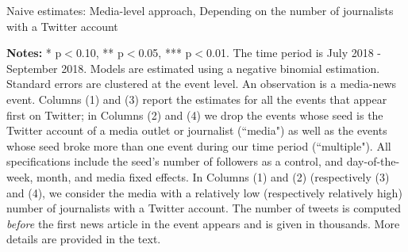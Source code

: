 \clearpage
\pagebreak
\begin{table}
\caption{Naive estimates: Media-level approach, Depending on the number of journalists with a Twitter account}
\begin{center}
	
\end{center}
\begin{spacing}{0.5}
	{\fns \textbf{Notes:} * p$<$0.10, ** p$<$0.05, *** p$<$0.01. The time period is July 2018 - September 2018. Models are estimated using a negative binomial estimation. Standard errors are clustered at the event level. An observation is a media-news event.  Columns (1) and (3) report the estimates for all the events that appear first on Twitter; in Columns (2) and (4)  we drop the events whose seed is the Twitter account of a media outlet or journalist (``media") as well as the events whose seed broke more than one event during our time period (``multiple"). All specifications include the seed's number of followers as a control, and day-of-the-week, month, and media fixed effects. In Columns (1) and (2) (respectively (3) and (4), we consider the media with a relatively low (respectively relatively high) number of journalists with a Twitter account. The number of tweets is computed \textit{before} the first news article in the event appears and is given in thousands. More details are provided in the text.} 
\end{spacing}
\label{Tab:number_articles_negbinomial_cevent_heterogeneity_nb_journalist_accounts}
\end{table} 


